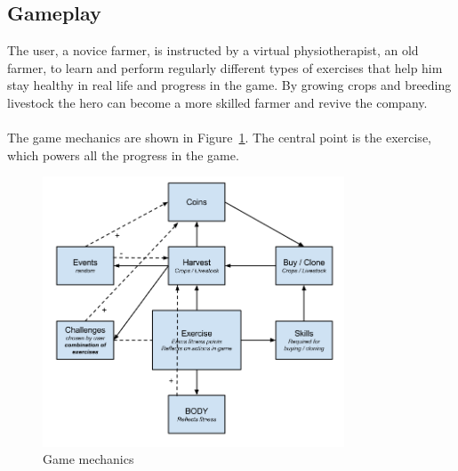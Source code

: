 \documentclass[a4paper,11pt,notitlepage]{report}
\begin{document}
\subsection{Gameplay}
The user, a novice farmer, is instructed by a virtual physiotherapist, an old farmer, to learn and perform regularly different types of exercises that help him stay healthy in real life and progress in the game. By growing crops and breeding livestock the hero can become a more skilled farmer and revive the company. 
\\\\
The game mechanics are shown in Figure~\ref{fig:gameconcept}. The central point is the exercise, which powers all the progress in the game. 

\begin{figure}[h]
	\centering
		\includegraphics[width=0.80\textwidth]{Images/gameconcept.png}
	\vspace{-15pt}
	\caption{Game mechanics}
	\label{fig:gameconcept}
\end{figure}
\end{document}
